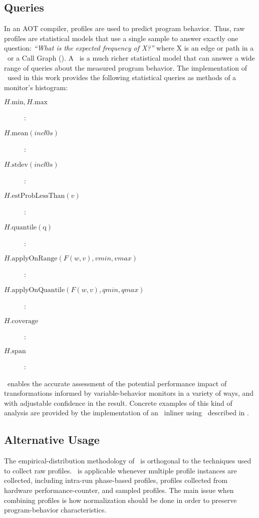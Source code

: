\subsection{Queries}
\label{cp:queries}

In an AOT compiler, profiles are used to predict program behavior.
Thus, raw profiles are statistical models that use a single sample to
answer exactly one question: {\em ``What is the expected frequency of
  X?''}  where X is an edge or path in a \CFG\ or a Call Graph (\CG).
A \CP\ is a much richer statistical model that can answer a wide range
of queries about the measured program behavior.  The implementation of
\CP\ used in this work provides the following statistical queries as
methods of a monitor's histogram:
\begin{description}

\item[$H.\mathrm{min}, H.\mathrm{max}$]: 

\item[$H.\mathrm{mean}(\mathit{incl0s})$]: 

\item[$H.\mathrm{stdev}(\mathit{incl0s})$]: 

\item[$H.\mathrm{estProbLessThan}(v)$]: 

\item[$H.\mathrm{quantile(q)}$]: 

\item[$H.\mathrm{applyOnRange}(F(w,v),\mathit{vmin},\mathit{vmax})$]: 

\item[$H.\mathrm{applyOnQuantile}(F(w,v),\mathit{qmin},\mathit{qmax})$]: 

\item[$H.\mathrm{coverage}$]: 

\item[$H.\mathrm{span}$]: 

\end{description}

\CP\ enables the accurate assessment of the
potential performance impact of transformations informed by
variable-behavior monitors in a variety of ways, and with adjustable
confidence in the result. Concrete examples of this kind of analysis
are provided by the implementation of an \FDO\ inliner using
\CP\ described in \cite{BerubePhD}.


\subsection{Alternative Usage}
\label{cp:extend}

The empirical-distribution methodology of \CP\ is orthogonal to the
techniques used to collect raw profiles.  \CP\ is applicable whenever
multiple profile instances are collected, including intra-run
phase-based profiles, profiles collected from hardware
performance-counter, and sampled profiles.  The main issue when
combining profiles is how normalization should be done in order to
preserve program-behavior characteristics.
